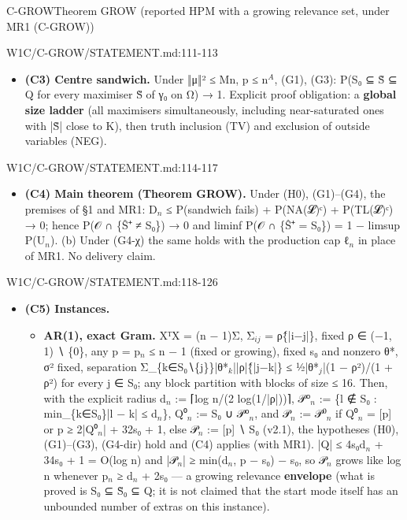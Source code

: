 \begin{card}{C-GROW}{Theorem GROW (reported HPM with a growing relevance set, under MR1 (C-GROW))}
\begin{stmt}{W1C/C-GROW/STATEMENT.md:111-113}
\begin{itemize}
\item \textbf{(C3) Centre sandwich.} Under ‖μ‖² ≤ Mn, p ≤ n$^{A}$, (G1), (G3): P(S₀ ⊆ S̃ ⊆ Q for every maximiser S̃ of γ₀ on Ω)
→ 1. Explicit proof obligation: a \textbf{global size ladder} (all maximisers simultaneously, including near-saturated
ones with |S̃| close to K), then truth inclusion (TV) and exclusion of outside variables (NEG).
\end{itemize}
\end{stmt}
\begin{stmt}{W1C/C-GROW/STATEMENT.md:114-117}
\begin{itemize}
\item \textbf{(C4) Main theorem (Theorem GROW).} Under (H0), (G1)–(G4), the premises of §1 and MR1:
D$_{n}$ ≤ P(sandwich fails) + P(NA(𝓛)ᶜ) + P(TL(𝓛)ᶜ) → 0; hence P(𝒪 ∩ \{Ŝ⁺ ≠ S₀\}) → 0 and
liminf P(𝒪 ∩ \{Ŝ⁺ = S₀\}) = 1 − limsup P(U$_{n}$). (b) Under (G4-χ) the same holds with the production cap ℓ$_{n}$ in place
of MR1. No delivery claim.
\end{itemize}
\end{stmt}
\begin{stmt}{W1C/C-GROW/STATEMENT.md:118-126}
\begin{itemize}
\item \textbf{(C5) Instances.}
\begin{itemize}
\item[(a)] \textbf{AR(1), exact Gram.} XᵀX = (n − 1)Σ, Σ$_{ij}$ = ρ\^\{|i−j|\}, fixed ρ ∈ (−1, 1) ∖ \{0\}, any p = p$_{n}$ ≤ n − 1 (fixed or
growing), fixed s₀ and nonzero θ*, σ² fixed, separation Σ\_\{k∈S₀∖\{j\}\}|θ*$_{k}$||ρ|\^\{|j−k|\} ≤ ½|θ*$_{j}$|(1 − ρ²)/(1 + ρ²)
for every j ∈ S₀; any block partition with blocks of size ≤ 16. Then, with the explicit radius
d$_{n}$ := ⌈log n/(2 log(1/|ρ|))⌉, 𝒫⁰$_{n}$ := \{l ∉ S₀ : min\_\{k∈S₀\}|l − k| ≤ d$_{n}$\}, Q⁰$_{n}$ := S₀ ∪ 𝒫⁰$_{n}$, and 𝒫$_{n}$ := 𝒫⁰$_{n}$
if Q⁰$_{n}$ = [p] or p ≥ 2|Q⁰$_{n}$| + 32s₀ + 1, else 𝒫$_{n}$ := [p] ∖ S₀ (v2.1), the hypotheses (H0), (G1)–(G3), (G4-dir) hold and (C4) applies (with MR1). |Q| ≤
4s₀d$_{n}$ + 34s₀ + 1 = O(log n) and |𝒫$_{n}$| ≥ min(d$_{n}$, p − s₀) − s₀, so 𝒫$_{n}$ grows like log n whenever p$_{n}$ ≥ d$_{n}$ + 2s₀ —
a growing relevance \textbf{envelope} (what is proved is S₀ ⊆ S̃₀ ⊆ Q; it is not claimed that the start mode itself
has an unbounded number of extras on this instance).
\end{itemize}
\end{itemize}

\end{stmt}
\end{card}
